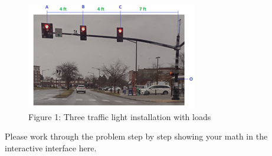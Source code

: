 \documentclass[
  letterpaper,
  DIV=11,
  numbers=noendperiod]{scrreprt}
\begin{document}
\begin{figure}[H]

{\centering \includegraphics{images/stoplights.png}

}

\caption{Figure 1: Three traffic light installation with loads}

\end{figure}%

Please work through the problem step by step showing your math in the
interactive interface here.
\end{document}
